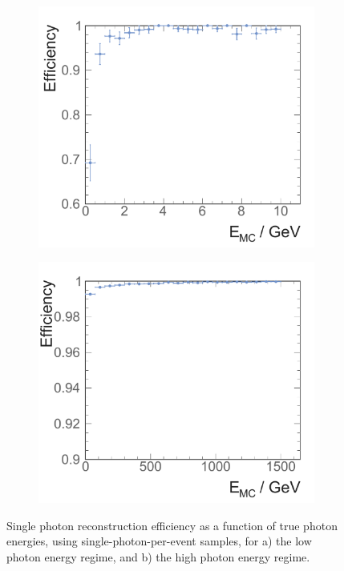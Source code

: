 \begin{figure}[tbph]
\centering
    \begin{subfigure}[b]{0.45\textwidth}
        \includegraphics[width=\textwidth]{photon/singlePhotonEff2fullEdt}
        \caption{}
        \label{fig:photonSingleEffLow}
    \end{subfigure}
    \begin{subfigure}[b]{0.45\textwidth}
        \includegraphics[width=\textwidth]{photon/singlePhotonEffEdt}
        \caption{}
        \label{fig:photonSingleEff}
    \end{subfigure}
\caption[Single photon reconstruction efficiency as a function of energy.]
{Single photon reconstruction efficiency as a function of true photon energies, using single-photon-per-event samples, for a) the low photon energy regime, and b) the high photon energy regime.}
\label{fig:photonSingleEffPerformance}
\end{figure}

